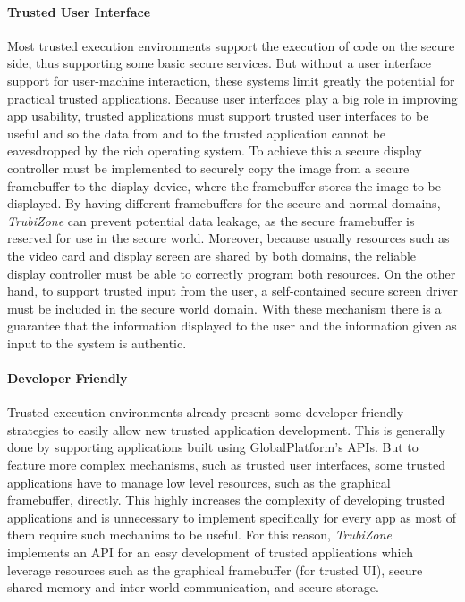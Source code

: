 \paragraph{\textbf{Trusted User Interface}}

Most trusted execution environments support the execution of code on the secure side, thus supporting some basic secure services. But without a user interface support for user-machine interaction, these systems limit greatly the potential for practical trusted applications. Because user interfaces play a big role in improving app usability, trusted applications must support trusted user interfaces to be useful and so the data from and to the trusted application cannot be eavesdropped by the rich operating system. To achieve this a secure display controller must be implemented to securely copy the image from a secure framebuffer to the display device, where the framebuffer stores the image to be displayed. By having different framebuffers for the secure and normal domains, \emph{TrubiZone} can prevent potential data leakage, as the secure framebuffer is reserved for use in the secure world. Moreover, because usually resources such as the video card and display screen are shared by both domains, the reliable display controller must be able to correctly program both resources. On the other hand, to support trusted input from the user, a self-contained secure screen driver must be included in the secure world domain. With these mechanism there is a guarantee that the information displayed to the user and the information given as input to the system is authentic.

\paragraph{\textbf{Developer Friendly}}

Trusted execution environments already present some developer friendly strategies to easily allow new trusted application development. This is generally done by supporting applications built using GlobalPlatform's APIs. But to feature more complex mechanisms, such as trusted user interfaces, some trusted applications have to manage low level resources, such as the graphical framebuffer, directly. This highly increases the complexity of developing trusted applications and is unnecessary to implement specifically for every app as most of them require such mechanims to be useful. For this reason, \emph{TrubiZone} implements an API for an easy development of trusted applications which leverage resources such as the graphical framebuffer (for trusted UI), secure shared memory and inter-world communication, and secure storage.

